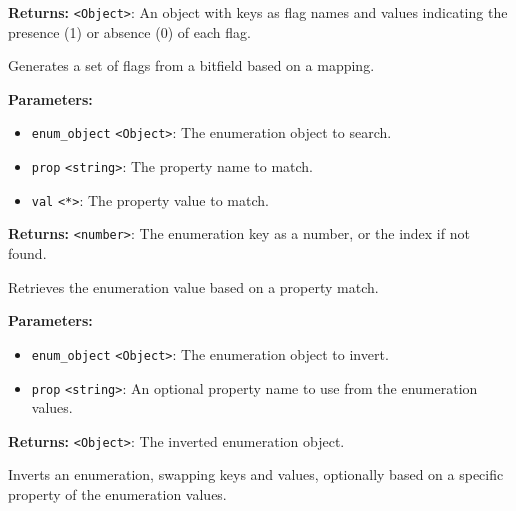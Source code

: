 \documentclass[12pt,a4paper]{article}
\begin{document}
\noindent \textbf{Returns:} \texttt{<Object>}: An object with keys as flag names and values indicating the presence (1) or absence (0) of each flag.

\noindent Generates a set of flags from a bitfield based on a mapping.

\vspace{5mm}
\noindent {}


\noindent \textbf{Parameters:}
\begin{itemize}
  \item \texttt{enum\_object} \texttt{<Object>}: The enumeration object to search.
  \item \texttt{prop} \texttt{<string>}: The property name to match.
  \item \texttt{val} \texttt{<*>}: The property value to match.
\end{itemize}

\noindent \textbf{Returns:} \texttt{<number>}: The enumeration key as a number, or the index if not found.

\noindent Retrieves the enumeration value based on a property match.

\vspace{5mm}
\noindent {}


\noindent \textbf{Parameters:}
\begin{itemize}
  \item \texttt{enum\_object} \texttt{<Object>}: The enumeration object to invert.
  \item \texttt{prop} \texttt{<string>}: An optional property name to use from the enumeration values.
\end{itemize}

\noindent \textbf{Returns:} \texttt{<Object>}: The inverted enumeration object.

\noindent Inverts an enumeration, swapping keys and values, optionally based on a specific property of the enumeration values.

\vspace{5mm}
\noindent {}
\end{document}

